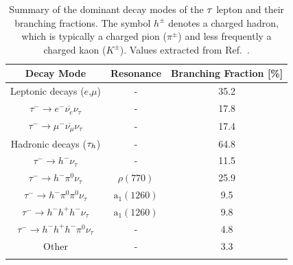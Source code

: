 \begin{table}[htbp]
\centering
\renewcommand{\arraystretch}{1.5} %
\begin{tabular}{|c|c|c|}
\hline
Decay Mode & Resonance & Branching Fraction [\%] \\ \hline \hline 
\rowcolor{verylightblue}
Leptonic decays ($e$,$\mu$)                               & - & 35.2 \\ 
\arrayrulecolor{lightgray} \hline
$\tau^- \rightarrow e^- \overline{\nu_e} \nu_\tau$ & - & 17.8 \\ 
\arrayrulecolor{lightgray} \hline
$\tau^- \rightarrow \mu^- \overline{\nu_\mu} \nu_\tau$ & - & 17.4 \\ 
\arrayrulecolor{lightgray}  \hline 
\rowcolor{verylightblue}
Hadronic decays ($\tau_h$)   & - & 64.8 \\ 
\arrayrulecolor{lightgray} \hline
$\tau^- \rightarrow h^- \nu_\tau$ & - & 11.5 \\ 
\arrayrulecolor{lightgray} \hline
$\tau^- \rightarrow h^- \pi^0\nu_\tau$ & $\rho(770)$ & 25.9 \\ 
\arrayrulecolor{lightgray} \hline
$\tau^- \rightarrow h^- \pi^0\pi^0\nu_\tau$ & $\mathrm{a_1}(1260)$ & 9.5 \\ 
\arrayrulecolor{lightgray} \hline
$\tau^- \rightarrow h^- h^+ h^- \nu_\tau$ & $\mathrm{a_1}(1260)$ & 9.8 \\ 
\arrayrulecolor{lightgray} \hline
$\tau^- \rightarrow h^- h^+ h^- \pi^0\nu_\tau$ & - & 4.8 \\ 
\arrayrulecolor{lightgray} \hline
Other & - & 3.3 \\ 
\arrayrulecolor{lightgray} \hline
\arrayrulecolor{black} \hline
\end{tabular}
\caption[Dominant $\PGt$ lepton decay modes and branching fractions]{Summary of the dominant decay modes of the $\PGt$ lepton and their branching fractions. The symbol $h^\pm$ denotes a charged hadron, which is typically a charged pion ($\pi^\pm$) and less frequently a charged kaon ($K^\pm$). Values extracted from Ref.~\cite{ParticleMasses}.}
\label{Table:Chapter4_TauDecayModes}
\end{table}

